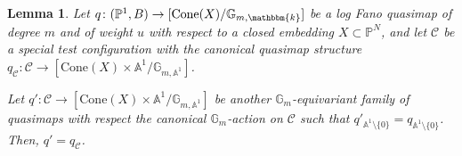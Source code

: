 \documentclass[12pt,twoside]{amsart}
\newtheorem{lem}[thm]{Lemma}
\theoremstyle{definition}
\begin{document}
\begin{lem} \label{lem--canonical-qm--str}
    Let $q\colon (\mathbb{P}^1,B)\to [\mathrm{Cone}(X)/\mathbb{G}_{m, \mathbbm{k}}]$ be a log Fano quasimap of degree $m$ and of weight $u$ with respect to a closed embedding $X\subset \mathbb{P}^N$, and let $\mathcal{C}$ be a special test configuration with the canonical quasimap structure $q_{\mathcal{C}}\colon \mathcal{C}\to [\mathrm{Cone}(X)\times\mathbb{A}^1/\mathbb{G}_{m,\mathbb{A}^1}]$.

    Let $q'\colon \mathcal{C}\to [\mathrm{Cone}(X)\times\mathbb{A}^1/\mathbb{G}_{m,\mathbb{A}^1}]$ be another $\mathbb{G}_m$-equivariant family of quasimaps with respect the canonical $\mathbb{G}_m$-action on $\mathcal{C}$ such that $q'_{\mathbb{A}^1\setminus\{0\}}=q_{\mathbb{A}^1\setminus\{0\}}$. Then, $q'=q_{\mathcal{C}}$.
\end{lem}
\end{document}
